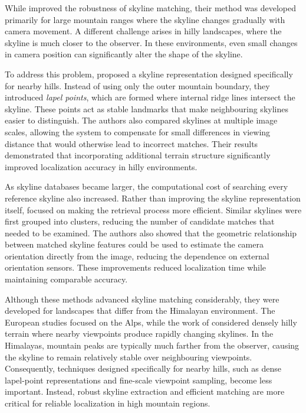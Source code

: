 While \cite{chen2015camera} improved the robustness of skyline matching, their method was developed primarily for large mountain ranges where the skyline changes gradually with camera movement. A different challenge arises in hilly landscapes, where the skyline is much closer to the observer. In these environments, even small changes in camera position can significantly alter the shape of the skyline.

To address this problem, \cite{pan2020camera} proposed a skyline representation designed specifically for nearby hills. Instead of using only the outer mountain boundary, they introduced \emph{lapel points}, which are formed where internal ridge lines intersect the skyline. These points act as stable landmarks that make neighbouring skylines easier to distinguish. The authors also compared skylines at multiple image scales, allowing the system to compensate for small differences in viewing distance that would otherwise lead to incorrect matches. Their results demonstrated that incorporating additional terrain structure significantly improved localization accuracy in hilly environments.

As skyline databases became larger, the computational cost of searching every reference skyline also increased. Rather than improving the skyline representation itself, \cite{pan2021fast} focused on making the retrieval process more efficient. Similar skylines were first grouped into clusters, reducing the number of candidate matches that needed to be examined. The authors also showed that the geometric relationship between matched skyline features could be used to estimate the camera orientation directly from the image, reducing the dependence on external orientation sensors. These improvements reduced localization time while maintaining comparable accuracy.

Although these methods advanced skyline matching considerably, they were developed for landscapes that differ from the Himalayan environment. The European studies focused on the Alps, while the work of \cite{pan2021fast} considered densely hilly terrain where nearby viewpoints produce rapidly changing skylines. In the Himalayas, mountain peaks are typically much farther from the observer, causing the skyline to remain relatively stable over neighbouring viewpoints. Consequently, techniques designed specifically for nearby hills, such as dense lapel-point representations and fine-scale viewpoint sampling, become less important. Instead, robust skyline extraction and efficient matching are more critical for reliable localization in high mountain regions.


